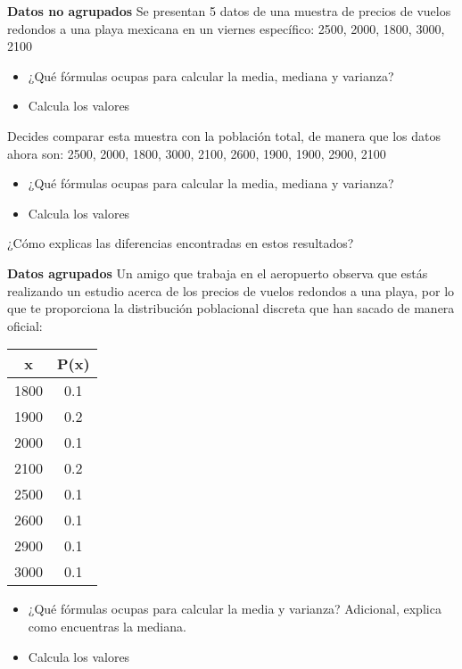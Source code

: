 \documentclass{oxmathproblems}
\begin{document}
\begin{questions}

\miquestion \textbf{Datos no agrupados} Se presentan 5 datos de una muestra de precios de vuelos redondos a una playa mexicana en un viernes específico: 2500, 2000, 1800, 3000, 2100

\begin{itemize}
\item ¿Qué fórmulas ocupas para calcular la media, mediana y varianza?
\item Calcula los valores
\end{itemize}

Decides comparar esta muestra con la población total, de manera que los datos ahora son: 2500, 2000, 1800, 3000, 2100, 2600, 1900, 1900, 2900, 2100

\begin{itemize}
\item ¿Qué fórmulas ocupas para calcular la media, mediana y varianza?
\item Calcula los valores
\end{itemize}

¿Cómo explicas las diferencias encontradas en estos resultados?

\miquestion \textbf{Datos agrupados} Un amigo que trabaja en el aeropuerto observa que estás realizando un estudio acerca de los precios de vuelos redondos a una playa, por lo que te proporciona la distribución poblacional discreta que han sacado de manera oficial:

\begin{center}
\begin{tabular}{ |c|c| } 
 \hline
 \textbf{x} & \textbf{P(x)} \\ 
 \hline
 1800 & 0.1 \\
 1900 & 0.2 \\
 2000 & 0.1 \\ 
 2100 & 0.2 \\ 
 2500 & 0.1 \\ 
 2600 & 0.1 \\ 
 2900 & 0.1 \\ 
 3000 & 0.1 \\ 
 \hline
\end{tabular}
\end{center}

\begin{itemize}
\item ¿Qué fórmulas ocupas para calcular la media y varianza? Adicional, explica como encuentras la mediana.
\item Calcula los valores
\end{itemize}


\end{questions}
\end{document}

